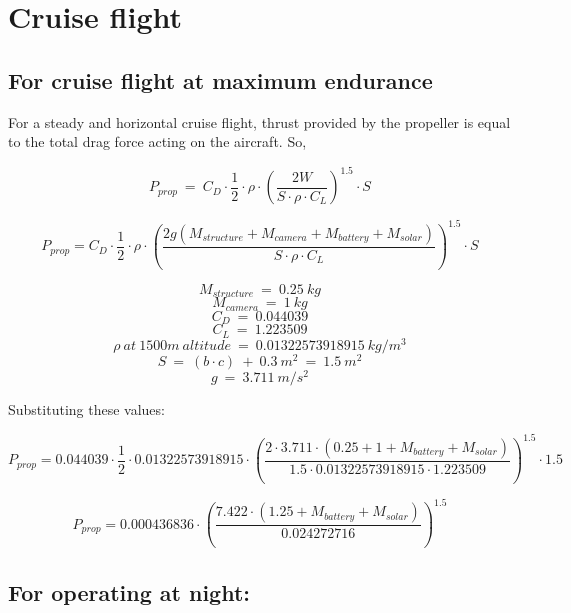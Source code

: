 
\chapter{Cruise flight}
\label{chap: Cruise Flight}

\section{For cruise flight at maximum endurance}

\p For a steady and horizontal cruise flight, thrust provided by the propeller is equal to the total drag force acting on the aircraft. So,




\[
P_{prop} \ = \  C_D \cdot \frac{1}{2} \cdot \rho \cdot \left(\frac{2W}{S \cdot \rho \cdot C_L }\right)^{1.5} \cdot S
\]

\[
P_{prop} = C_D \cdot \frac{1}{2} \cdot \rho \cdot \left(\frac{2g(M_{structure} + M_{camera} + M_{battery} + M_{solar})}{S \cdot \rho \cdot C_L} \right)^{1.5} \cdot S
\]

\[ M_{structure} \ = \ 0.25 \ kg \]
\[ M_{camera} \ = \ 1 \ kg \]
\[ C_D \ = \ 0.044039 \]
\[ C_L \ = \ 1.223509 \]
\[ \rho \ at \ 1500m \ altitude \ = \ 0.01322573918915 \ kg/m^3 \]
\[S \ = \ ( b \cdot c ) \ + \ 0.3 \ m^2 \ = \ 1.5 \ m^2\]
\[g \ = \ 3.711 \ m/s^2 \]

Substituting these values:

\[
P_{prop} = 0.044039 \cdot \frac{1}{2} \cdot 0.01322573918915 \cdot \left(\frac{2 \cdot 3.711 \cdot (0.25 + 1 + M_{battery} + M_{solar})}{1.5 \cdot 0.01322573918915 \cdot 1.223509} \right)^{1.5} \cdot 1.5
\]

\[
P_{prop} = 0.000436836 \cdot \left(\frac{7.422 \cdot (1.25 + M_{battery} + M_{solar})}{ 0.024272716 } \right)^{1.5}
\]


\section{For operating at night:}

